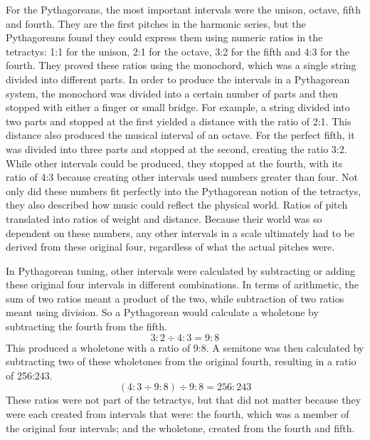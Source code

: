 For the Pythagoreans, the most important intervals were the unison, octave,
fifth and fourth. They are the first pitches in the harmonic series, but the
Pythagoreans found they could express them using numeric ratios in the
tetractys: 1:1 for the unison, 2:1 for the octave, 3:2 for the fifth and 4:3 for
the fourth. They proved these ratios using the monochord, which was a single
string divided into different parts.  In order to produce the intervals in a
Pythagorean system, the monochord was divided into a certain number of parts and
then stopped with either a finger or small bridge.  For example, a string
divided into two parts and stopped at the first yielded a distance with the
ratio of 2:1.  This distance also produced the musical interval of an octave.
For the perfect fifth, it was divided into three parts and stopped at the
second, creating the ratio 3:2.  While other intervals could be produced, they
stopped at the fourth, with its ratio of 4:3 because creating other intervals
used numbers greater than four.  Not only did these numbers fit perfectly into
the Pythagorean notion of the tetractys, they also described how music could
reflect the physical world.  Ratios of pitch translated into ratios of weight
and distance. Because their world was so dependent on these numbers, any other
intervals in a scale ultimately had to be derived from these original four,
regardless of what the actual pitches were.\autocite[274]{CN:1}

In Pythagorean tuning, other intervals were calculated by subtracting or adding these
original four intervals in different combinations.  In terms of arithmetic, the sum of two
ratios meant a product of the two, while subtraction of two ratios meant using division.
So a Pythagorean would calculate a wholetone by subtracting the fourth from the fifth.
\begin{equation}
3:2 \div 4:3 = 9:8
\end{equation}
This produced a wholetone with a ratio of 9:8. A semitone was then calculated by
subtracting two of these wholetones from the original fourth, resulting in a ratio
of 256:243. 
\begin{equation}
    (4:3 \div 9:8) \div 9:8 = 256:243
\end{equation}
These ratios were not part of the tetractys,
but that did not matter because they were each created from intervals that
were: the fourth, which was a member of the original four intervals; and the
wholetone, created from the fourth and fifth.

